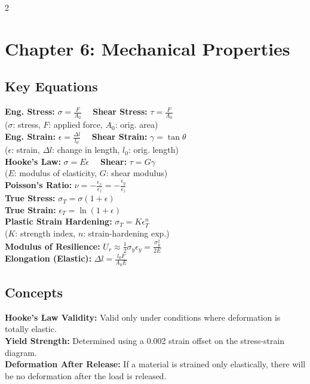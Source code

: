 \documentclass[8pt]{article}
\begin{document}
\begin{multicols*}{2}
  \section*{Chapter 6: Mechanical Properties}
  \subsection*{Key Equations}
  \textbf{Eng. Stress:} \( \sigma = \frac{F}{A_0} \) \ \ \textbf{Shear Stress:} \( \tau = \frac{F}{A_0} \) \\
  (\( \sigma \): stress, \( F \): applied force, \( A_0 \): orig. area) \\

  \textbf{Eng. Strain:} \( \epsilon = \frac{\Delta l}{l_0} \) \ \ \textbf{Shear Strain:} \( \gamma = \tan \theta \) \\
  (\( \epsilon \): strain, \( \Delta l \): change in length, \( l_0 \): orig. length) \\

  \textbf{Hooke's Law:} \( \sigma = E\epsilon \) \ \ \textbf{Shear:} \( \tau = G\gamma \) \\
  (\( E \): modulus of elasticity, \( G \): shear modulus) \\

  \textbf{Poisson's Ratio:} \( \nu = -\frac{\epsilon_x}{\epsilon_z} = -\frac{\epsilon_y}{\epsilon_z} \) \\

  \textbf{True Stress:} \( \sigma_T = \sigma(1+\epsilon) \) \\
  \textbf{True Strain:} \( \epsilon_T = \ln(1+\epsilon) \) \\

  \textbf{Plastic Strain Hardening:} \( \sigma_T = K \epsilon_T^n \) \\
  (\( K \): strength index, \( n \): strain-hardening exp.) \\

  \textbf{Modulus of Resilience:} \( U_r \approx \frac{1}{2}\sigma_y\epsilon_y = \frac{\sigma_y^2}{2E} \) \\

  \textbf{Elongation (Elastic):} \( \Delta l = \frac{l_0 F}{A_0 E} \)

  \subsection*{Concepts}
  \textbf{Hooke's Law Validity:} Valid only under conditions where deformation is totally elastic. \\
  \textbf{Yield Strength:} Determined using a 0.002 strain offset on the stress-strain diagram. \\
  \textbf{Deformation After Release:} If a material is strained only elastically, there will be no deformation after the load is released.


\end{multicols*}
\end{document}
